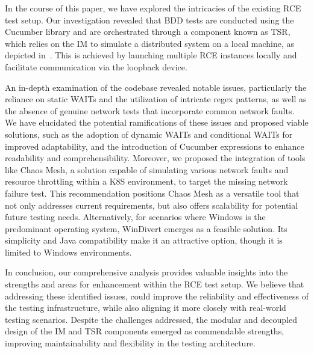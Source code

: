 \label{sec:conclusion}
In the course of this paper, we have explored the intricacies of the existing RCE test setup. Our investigation revealed that \acf{BDD} tests are conducted using the Cucumber library and are orchestrated through a component known as \acf{TSR}, which relies on the \acf{IM} to simulate a distributed system on a local machine, as depicted in~. This is achieved by launching multiple RCE instances locally and facilitate communication via the loopback device. 

An in-depth examination of the codebase revealed notable issues, particularly the reliance on static WAITs and the utilization of intricate regex patterns, as well as the absence of genuine network tests that incorporate common network faults. We have elucidated the potential ramifications of these issues and proposed viable solutions, such as the adoption of dynamic WAITs and conditional WAITs for improved adaptability, and the introduction of Cucumber expressions to enhance readability and comprehensibility. Moreover, we proposed the integration of tools like Chaos Mesh, a solution capable of simulating various network faults and resource throttling within a \acf{K8S} environment, to target the missing network failure test. This recommendation positions Chaos Mesh as a versatile tool that not only addresses current requirements, but also offers scalability for potential future testing needs. Alternatively, for scenarios where Windows is the predominant operating system, WinDivert emerges as a feasible solution. Its simplicity and Java compatibility make it an attractive option, though it is limited to Windows environments. 

In conclusion, our comprehensive analysis provides valuable insights into the strengths and areas for enhancement within the RCE test setup. We believe that addressing these identified issues, could improve the reliability and effectiveness of the testing infrastructure, while also aligning it more closely with real-world testing scenarios. Despite the challenges addressed, the modular and decoupled design of the \ac{IM} and \ac{TSR} components emerged as commendable strengths, improving maintainability and flexibility in the testing architecture.
